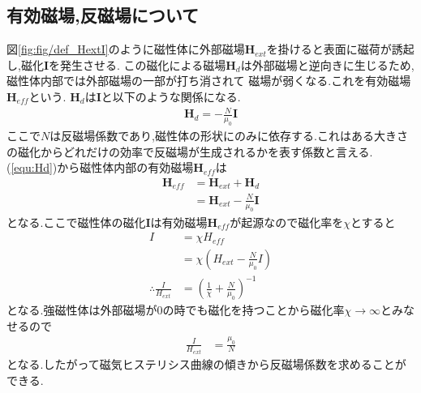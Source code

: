 \subsection{有効磁場,反磁場について}
図\ref{fig:fig/def_HextI}のように磁性体に外部磁場$\bm{H}_{ext}$を掛けると表面に磁荷が誘起し,磁化$\bm{I}$を発生させる.
この磁化による磁場$\bm{H}_d$は外部磁場と逆向きに生じるため,磁性体内部では外部磁場の一部が打ち消されて
磁場が弱くなる.これを有効磁場$\bm{H}_{eff}$という. $\bm{H}_d$は$\bm{I}$と以下のような関係になる.
\begin{align}
  \label{equ:Hd}
  \bm{H}_d=-\frac{N}{\mu_0}\bm{I}
\end{align}
ここで$N$は反磁場係数であり,磁性体の形状にのみに依存する.これはある大きさの磁化からどれだけの効率で反磁場が生成されるかを表す係数と言える.
(\ref{equ:Hd})から磁性体内部の有効磁場$\bm{H}_{eff}$は
\begin{align}
  \bm{H}_{eff}&=\bm{H}_{ext}+\bm{H}_d\nonumber\\
  &=\bm{H}_{ext}-\frac{N}{\mu_0}\bm{I}
\end{align}
となる.ここで磁性体の磁化$\bm{I}$は有効磁場$\bm{H}_{eff}$が起源なので磁化率を$\chi$とすると
\begin{align}
  \label{equ:IchiHeff}
  I&=\chi H_{eff}\nonumber\\
  &=\chi(H_{ext}-\frac{N}{\mu_0}I)\nonumber\\
  \therefore \frac{I}{H_{ext}}&=\left(\frac{1}{\chi}+\frac{N}{\mu_0}\right)^{-1}
\end{align}
となる.強磁性体は外部磁場が$0$の時でも磁化を持つことから磁化率$\chi\rightarrow\infty$とみなせるので
\begin{align}
  \label{equ:hysteresis_hanjiba}
  \frac{I}{H_{ext}}&=\frac{\mu_0}{N}
\end{align}
となる.したがって磁気ヒステリシス曲線の傾きから反磁場係数を求めることができる.
